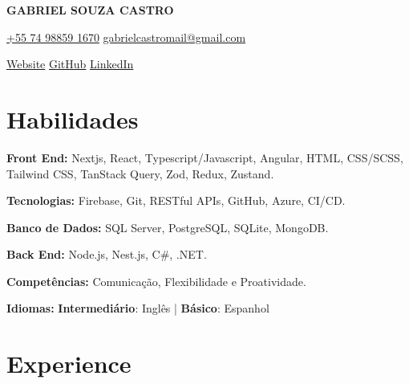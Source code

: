 \documentclass[a4paper,10pt]{article}
\begin{document}

\noindent
\begin{minipage}[t]{0.5\textwidth}
\textbf{\Large GABRIEL SOUZA CASTRO}

\vspace{0.4em}

\end{minipage}%
\begin{minipage}[t]{0.5\textwidth}
\raggedleft
{\color{blue}} \href{https://example.com}{\faPhone \space +55 74 98859 1670} \quad
{\color{blue}} \href{mailto:gabrielcastromail@gmail.com}{\faEnvelope \space gabrielcastromail@gmail.com}

\vspace{0.2em}

{\color{blue}} \href{https://gabrcastro.vercel.app}{\faGlobe \space Website} \quad
{\color{blue}} \href{https://github.com/gabrcastro}{\faGithub \space GitHub} \quad
{\color{blue}} \href{https://linkedin.com/in/gabrielsouzacastro}{\faLinkedin \space LinkedIn} \\
\end{minipage}

\vspace{0.5em}

\section*{Habilidades}
\vspace{0.6em}
\item \textbf{Front End:} Nextjs, React, Typescript/Javascript, Angular, HTML, CSS/SCSS, Tailwind CSS, TanStack Query, Zod, Redux, Zustand.
\item \textbf{Tecnologias:} Firebase, Git, RESTful APIs, GitHub, Azure, CI/CD.
\item \textbf{Banco de Dados:} SQL Server, PostgreSQL, SQLite, MongoDB.
\item \textbf{Back End:} Node.js, Nest.js, C#, .NET.
\item \textbf{Competências:} Comunicação, Flexibilidade e Proatividade.
\item \textbf{Idiomas:} \textbf{Intermediário}: Inglês | \textbf{Básico}: Espanhol

\vspace{1em}

\section*{Experience}
\vspace{0.6em}
\end{document}
